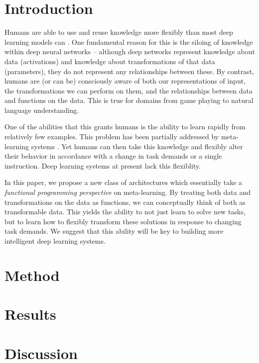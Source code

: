 \documentclass[11pt]{article}
\begin{document}
\section{Introduction}
Humans are able to use and reuse knowledge more flexibly than most deep learning models can \citep{Lake2017}. One fundamental reason for this is the siloing of knowledge within deep neural networks -- although deep networks represent knowledge about data (activations) and knowledge about transformations of that data (parameters), they do not represent any relationships between these. By contrast, humans are (or can be) consciously aware of both our representations of input, the transformations we can perform on them, and the relationships between data and functions on the data. This is true for domains from game playing to natural language understanding. \par
One of the abilities that this grants humans is the ability to learn rapidly from relatively few examples. This problem has been partially addressed by meta-learning systems \citep{}. Yet humans can then take this knowledge and flexibly alter their behavior in accordance with a change in task demands or a single instruction. Deep learning systems at present lack this flexiblity. \par
In this paper, we propose a new class of architectures which essentially take a \emph{functional programming perspective} on meta-learning. By treating both data and transformations on the data as functions, we can conceptually think of both as transformable data. This yields the ability to not just learn to solve new tasks, but to learn how to flexibly transform these solutions in response to changing task demands. We suggest that this ability will be key to building more intelligent deep learning systems. \par

\section{Method}


\section{Results}

\section{Discussion}
\end{document}
